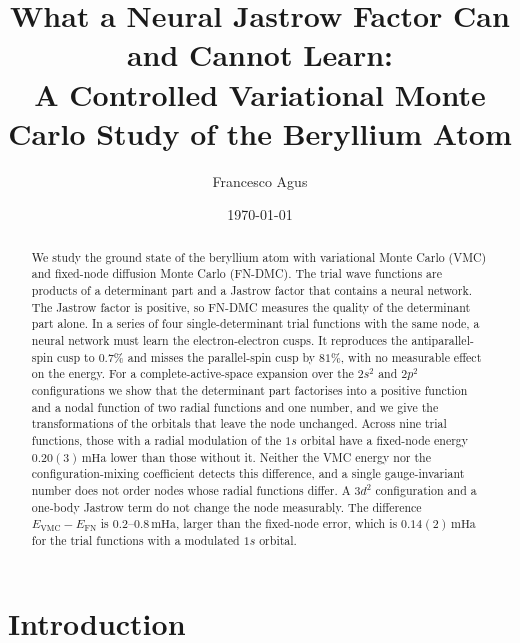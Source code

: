 \documentclass[aps,prb,reprint,amsmath,amssymb,superscriptaddress,nofootinbib]{revtex4-2}
\newcommand{\mHa}{\,\mathrm{mHa}}
\begin{document}
\title{What a Neural Jastrow Factor Can and Cannot Learn:\\
A Controlled Variational Monte Carlo Study of the Beryllium Atom}

\author{Francesco Agus}

\date{\today}

\begin{abstract}
We study the ground state of the beryllium atom with variational Monte Carlo
(VMC) and fixed-node diffusion Monte Carlo (FN-DMC). The trial wave functions
are products of a determinant part and a Jastrow factor that contains a
neural network. The Jastrow factor is positive, so FN-DMC measures the quality
of the determinant part alone. In a series of four single-determinant trial
functions with the same node, a neural network must learn the
electron-electron cusps. It reproduces the antiparallel-spin cusp to $0.7\%$
and misses the parallel-spin cusp by $81\%$, with no measurable effect on the
energy. For a
complete-active-space expansion over the $2s^2$ and $2p^2$ configurations we
show that the determinant part factorises into a positive function and a
nodal function of two radial functions and one number, and we give the
transformations of the orbitals that leave the node unchanged. Across nine
trial functions, those with a radial modulation of the $1s$ orbital have a
fixed-node energy $0.20(3)\mHa$ lower than those without it. Neither the VMC
energy nor the configuration-mixing coefficient detects this difference, and
a single gauge-invariant number does not order nodes whose radial functions
differ. A $3d^2$ configuration and a one-body Jastrow term do not change the
node measurably. The difference $E_{\mathrm{VMC}} - E_{\mathrm{FN}}$ is
$0.2$--$0.8\mHa$, larger than the fixed-node error, which is $0.14(2)\mHa$ for
the trial functions with a modulated $1s$ orbital.
\end{abstract}

\maketitle


\section{Introduction}
\label{sec:intro}
\end{document}
